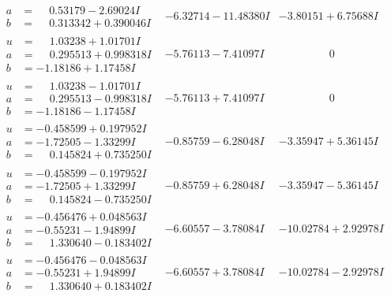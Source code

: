 \documentclass[1p]{elsarticle_modified}
\theoremstyle{definition}
\begin{document}
$$\begin{array}{c|c|c}
\begin{aligned}
a &= \phantom{-}0.53179 - 2.69024 I \\
b &= \phantom{-}0.313342 + 0.390046 I\end{aligned}
 & -6.32714 - 11.48380 I & -3.80151 + 6.75688 I \\ \hline\begin{aligned}
u &= \phantom{-}1.03238 + 1.01701 I \\
a &= \phantom{-}0.295513 + 0.998318 I \\
b &= -1.18186 + 1.17458 I\end{aligned}
 & -5.76113 - 7.41097 I & \phantom{-0.000000 } 0 \\ \hline\begin{aligned}
u &= \phantom{-}1.03238 - 1.01701 I \\
a &= \phantom{-}0.295513 - 0.998318 I \\
b &= -1.18186 - 1.17458 I\end{aligned}
 & -5.76113 + 7.41097 I & \phantom{-0.000000 } 0 \\ \hline\begin{aligned}
u &= -0.458599 + 0.197952 I \\
a &= -1.72505 - 1.33299 I \\
b &= \phantom{-}0.145824 + 0.735250 I\end{aligned}
 & -0.85759 - 6.28048 I & -3.35947 + 5.36145 I \\ \hline\begin{aligned}
u &= -0.458599 - 0.197952 I \\
a &= -1.72505 + 1.33299 I \\
b &= \phantom{-}0.145824 - 0.735250 I\end{aligned}
 & -0.85759 + 6.28048 I & -3.35947 - 5.36145 I \\ \hline\begin{aligned}
u &= -0.456476 + 0.048563 I \\
a &= -0.55231 - 1.94899 I \\
b &= \phantom{-}1.330640 - 0.183402 I\end{aligned}
 & -6.60557 - 3.78084 I & -10.02784 + 2.92978 I \\ \hline\begin{aligned}
u &= -0.456476 - 0.048563 I \\
a &= -0.55231 + 1.94899 I \\
b &= \phantom{-}1.330640 + 0.183402 I\end{aligned}
 & -6.60557 + 3.78084 I & -10.02784 - 2.92978 I \\ \hline\begin{aligned}

\end{aligned}
\end{array}$$
\end{document}
